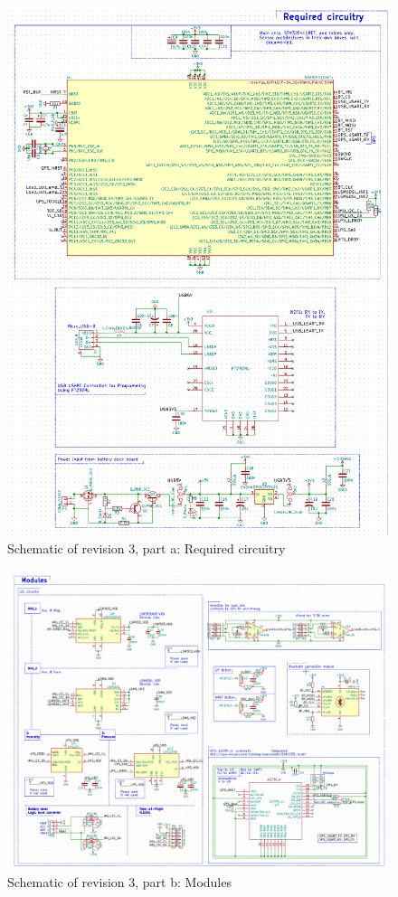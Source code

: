 \begin{figure}[htb]
	\centering
    \includegraphics[width=\linewidth]{Figures/schem_r3_a.png}
	\caption{Schematic of revision 3, part a: Required circuitry}
	\label{fig:schr3a}
\end{figure}
\begin{figure}[tbh]
	\centering
    \includegraphics[width=\linewidth]{Figures/schem_r3_b.png}
	\caption{Schematic of revision 3, part b: Modules}
	\label{fig:schr3b}
\end{figure}
